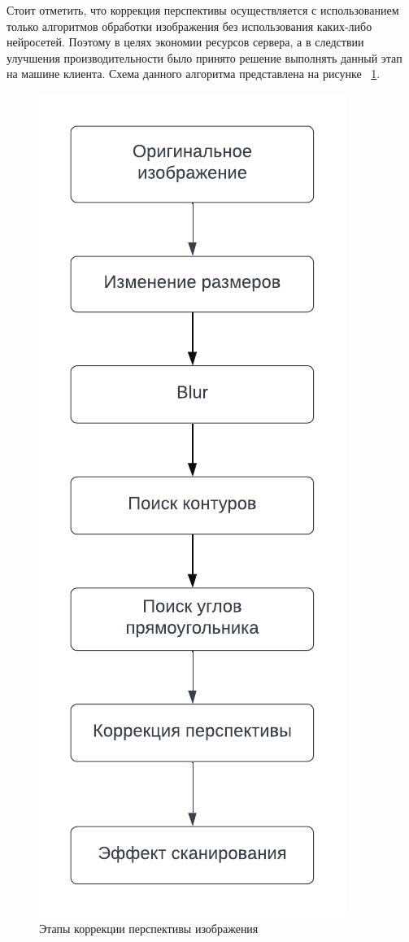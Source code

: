 Стоит отметить, что коррекция перспективы осуществляется с использованием только алгоритмов обработки изображения без использования каких-либо нейросетей. 
Поэтому в целях экономии ресурсов сервера, а в следствии улучшения производительности было принято решение выполнять данный этап на машине клиента.
Схема данного алгоритма представлена на рисунке ~\ref{perspective_correction_algo}.
\begin{figure}
    \includegraphics[scale=0.75]{img/perspective_correction}
    \caption{Этапы коррекции перспективы изображения}
    \label{perspective_correction_algo}
\end{figure}

